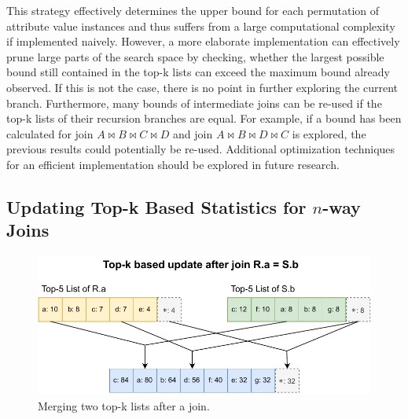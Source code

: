 This strategy effectively determines the upper bound for each permutation of attribute value instances and thus suffers from a large computational complexity if implemented naively.
However, a more elaborate implementation can effectively prune large parts of the search space by checking, whether the largest possible bound still contained in the top-k lists can exceed the maximum bound already observed. If this is not the case, there is no point in further exploring the current branch. Furthermore, many bounds of intermediate joins can be re-used if the top-k lists of their recursion branches are equal. For example, if a bound has been calculated for join $A \bowtie B \bowtie C \bowtie D$ and join $A \bowtie B \bowtie D \bowtie C$ is explored, the previous results could potentially be re-used.
Additional optimization techniques for an efficient implementation should be explored in future research.

\subsection{Updating Top-k Based Statistics for $n$-way Joins}
\label{sec:tighter-bounds-stats}

\begin{figure}[tb]
	\centering
	\includegraphics[width=0.8\linewidth]{figures/top-k-update.pdf}
	\caption{Merging two top-k lists after a join.}
	\label{fig:topk-update-merge}
\end{figure}

